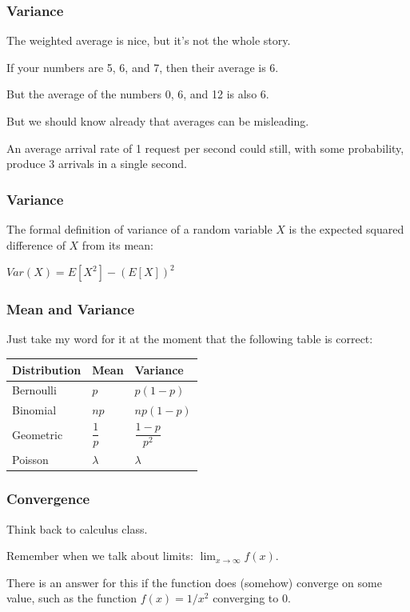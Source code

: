 \begin{frame}
\frametitle{Variance}

The weighted average is nice, but it's not the whole story. 

If your numbers are 5, 6, and 7, then their average is 6. 

But the average of the numbers 0, 6, and 12 is also 6. 

But we should know already that averages can be misleading.

An average arrival rate of 1 request per second could still, with some probability, produce 3 arrivals in a single second.

\end{frame}



\begin{frame}
\frametitle{Variance}

The formal definition of variance of a random variable $X$ is the expected squared difference of $X$ from its mean:

\begin{center}
	$Var(X) = E[X^{2}] - (E[X])^{2}$
\end{center}


\end{frame}



\begin{frame}
\frametitle{Mean and Variance}

Just take my word for it at the moment that the following table is correct:

\begin{center}
\begin{tabular}{|l|l|l|}
	\hline
	\textbf{Distribution} & \textbf{Mean} & \textbf{Variance}\\ \hline
	Bernoulli & $p$ & $p(1-p)$\\ \hline
	Binomial & $np$ & $np(1-p)$\\ \hline
	Geometric & $\dfrac{1}{p}$ & $\dfrac{1-p}{p^{2}}$ \\ \hline
	Poisson & $\lambda$ & $\lambda$\\ \hline
\end{tabular}
\end{center}

\end{frame}



\begin{frame}
\frametitle{Convergence}

Think back to calculus class. 

Remember when we talk about limits: $\lim_{x\to\infty} f(x)$. 

There is an answer for this if the function does (somehow) converge on some value, such as the function $f(x) = 1/x^{2}$ converging to 0.

\end{frame}




